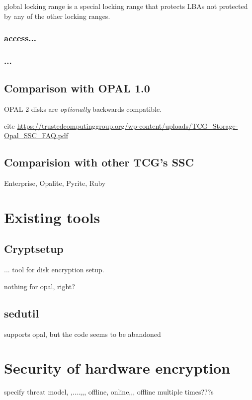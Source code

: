 \documentclass[
  digital, %
  oneside, %
  nolof,     %
  nolot,     %
]{fithesis4}
\begin{document}
global locking range is a special locking range that protects LBAs not protected by any of the other locking ranges.

\subsection{access...}
\subsection{...}


\section{Comparison with OPAL 1.0}

OPAL 2 disks are \emph{optionally} backwards compatible.

cite \url{https://trustedcomputinggroup.org/wp-content/uploads/TCG_Storage-Opal_SSC_FAQ.pdf}

\section{Comparision with other TCG's SSC}

Enterprise, Opalite, Pyrite, Ruby

\chapter{Existing tools}

\section{Cryptsetup}

... tool for disk encryption setup.

nothing for opal, right?

\section{sedutil}

supports opal, but the code seems to be abandoned

\chapter{Security of hardware encryption}

specify threat model, ,....,,, offline, online,,, offline multiple times???s
\end{document}
